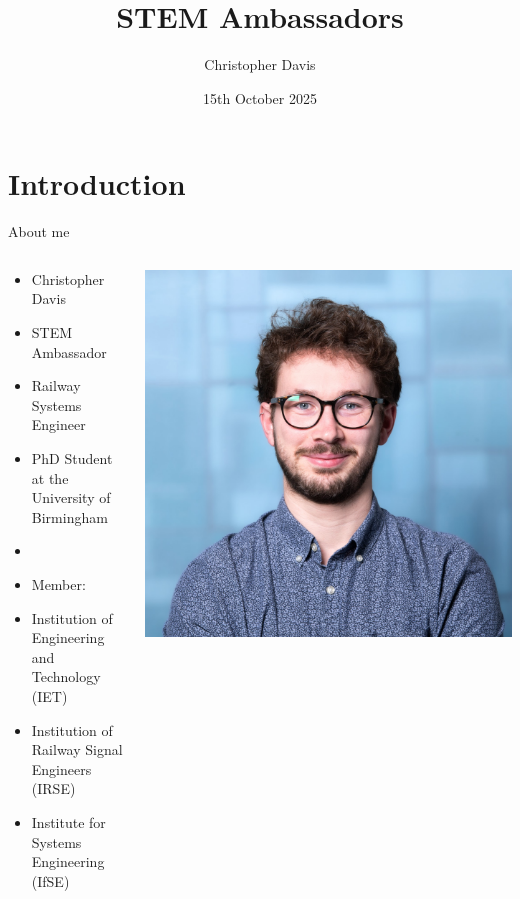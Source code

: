 \documentclass[
    aspectratio=169
]{beamer}
\title{STEM Ambassadors}
\date{15th October 2025}
\author{Christopher Davis}
\begin{document}
\begin{frame}
\titlepage
\end{frame}

\section{Introduction}

\begin{frame}{About me}
	\begin{columns}[T] %
		\begin{column}{0.5\textwidth}
			\begin{itemize}
				\item Christopher Davis
				\item STEM Ambassador
				\item Railway Systems Engineer
				\item PhD Student at the University of Birmingham
				\item 
				\item Member:
				\item Institution of Engineering and Technology (IET)
				\item Institution of Railway Signal Engineers (IRSE)
				\item Institute for Systems Engineering (IfSE)
				
			\end{itemize}
		\end{column}
		
		\begin{column}{0.5\textwidth}
			\includegraphics[width=\textwidth]{images/headshot.jpeg}
		\end{column}
	\end{columns}
	
\end{frame}
\end{document}

